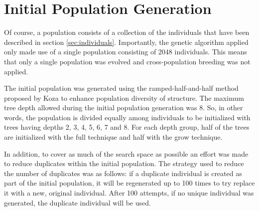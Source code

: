 \section{Initial Population Generation}

Of course, a population consists of a collection of the individuals that have been described in section \ref{sec:individuals}. Importantly, the genetic algorithm applied only made use of a single population consisting of 2048 individuals. This means that only a single population was evolved and cross-population breeding was not applied.

The initial population was generated using the ramped-half-and-half method proposed by Koza \cite{koza1992genetic} to enhance population diversity of structure. The maximum tree depth allowed during the initial population generation was 8. So, in other words, the population is divided equally among individuals to be initialized with trees having depths 2, 3, 4, 5, 6, 7 and 8. For each depth group, half of the trees are initialized with the full technique and half with the grow technique.

In addition, to cover as much of the search space as possible an effort was made to reduce duplicates within the initial population. The strategy used to reduce the number of duplicates was as follows: if a duplicate individual is created as part of the initial population, it will be regenerated up to 100 times to try replace it with a new, original individual. After 100 attempts, if no unique individual was generated, the duplicate individual will be used.